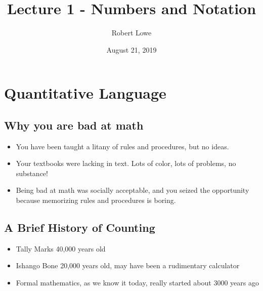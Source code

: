 \documentclass{article}
\title{Lecture 1 - Numbers and Notation}
\author{Robert Lowe}
\date{August 21, 2019}
\begin{document}
\maketitle
\section{Quantitative Language}
\subsection{Why you are bad at math}
\begin{itemize}
    \item You have been taught a litany of rules and procedures, but no ideas.
    \item Your textbooks were lacking in text.  Lots of color, lots of problems, no substance!
    \item Being bad at math was socially acceptable, and you seized the opportunity because memorizing rules and procedures is boring.
\end{itemize}
\subsection{A Brief History of Counting}
\begin{itemize}
    \item Tally Marks 40,000 years old 
    \item Ishango Bone 20,000 years old, may have been a rudimentary calculator
    \item Formal mathematics, as we know it today, really started about 3000 years ago
\end{itemize}
\end{document}
